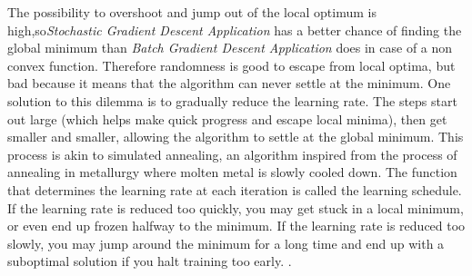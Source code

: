 \documentclass[conference]{IEEEtran}
\begin{document}
The possibility to overshoot and jump out of the local optimum is high,so\textit{Stochastic Gradient Descent Application} has a better chance of finding the global minimum than \textit{Batch Gradient Descent Application} does in case of a non convex function. 
Therefore randomness is good to escape from local optima, but bad because it means that the algorithm can never settle at the minimum. One solution to this dilemma is to gradually reduce the learning rate. The steps start out large (which helps make quick progress and escape local minima), then get smaller and smaller, allowing the algorithm to settle at the global minimum. This process is akin to simulated annealing, an algorithm inspired from the process of annealing in metallurgy where molten metal is slowly cooled down. The function that determines the learning rate at each iteration is called the learning schedule. If the learning rate is reduced too quickly, you may get stuck in a local minimum, or even end up frozen halfway to the minimum. If the learning rate is reduced too slowly, you may jump around the minimum for a long time and end up with a suboptimal solution if you halt training too early. \cite{Scikit-Learn}.
\end{document}
